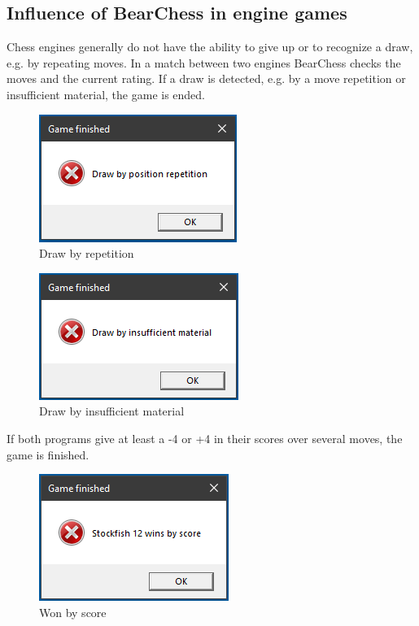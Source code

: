 \documentclass[11pt,a4paper]{article}
\begin{document}
\subsection{Influence of BearChess in engine games}
Chess engines generally do not have the ability to give up or to recognize a draw, e.g. by repeating moves. In a match between two engines BearChess checks the moves and the current rating. 
If a draw is detected, e.g. by a move repetition or insufficient material, the game is ended.

\begin{figure}[H]
	\centering
	\includegraphics[scale=1.0]{Games3.png}
	\caption{Draw by repetition}
	\label{fig:Games3}
\end{figure}

\begin{figure}[H]
	\centering
	\includegraphics[scale=1.0]{Games5.png}
	\caption{Draw by insufficient material}
	\label{fig:Games5}
\end{figure}

If both programs give at least a -4 or +4 in their scores over several moves, the game is finished.

\begin{figure}[H]
	\centering
	\includegraphics[scale=1.0]{Games4.png}
	\caption{Won by score}
	\label{fig:Games4}
\end{figure}
\end{document}
